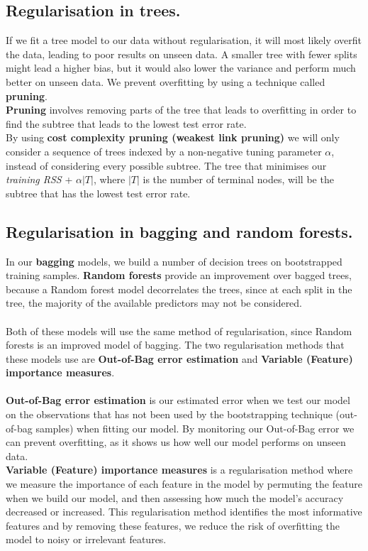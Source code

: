 \documentclass[12pt]{article}
\begin{document}
\subsection*{Regularisation in trees.}
If we fit a tree model to our data without regularisation, it will most likely overfit the data, leading to poor results on unseen data. 
A smaller tree with fewer splits might lead a higher bias, but it would also lower the variance and perform much better on unseen data.
We prevent overfitting by using a technique called \textbf{pruning}.\\
\textbf{Pruning} involves removing parts of the tree that leads to overfitting in order to find the subtree that leads to the lowest test error rate.
\\ By using \textbf{cost complexity pruning (weakest link pruning)} we will only consider a sequence of trees indexed by a non-negative tuning parameter $\alpha$,
instead of considering every possible subtree. The tree that minimises our \textit{training RSS} + $\alpha|T|$, where $|T|$ is the number of terminal nodes,
will be the subtree that has the lowest test error rate.

\subsection*{Regularisation in bagging and random forests.}
In our \textbf{bagging} models, we build a number of decision trees on bootstrapped training samples. \textbf{Random forests}
provide an improvement over bagged trees, because a Random forest model decorrelates the trees, since at each split in the tree,
the majority of the available predictors may not be considered. \\ \\
Both of these models will use the same method of regularisation, since Random forests is an improved model of bagging.
The two regularisation methods that these models use are \textbf{Out-of-Bag error estimation} and \textbf{Variable (Feature) importance measures}.
\\ \\
\textbf{Out-of-Bag error estimation} is our estimated error when we test our model on the observations that has not been used by the bootstrapping technique (out-of-bag samples) when fitting our model.
By monitoring our Out-of-Bag error we can prevent overfitting, as it shows us how well our model performs on unseen data.\\
\textbf{Variable (Feature) importance measures} is a regularisation method where we measure the importance of each feature in the model by permuting the feature when we build our model,
and then assessing how much the model's accuracy decreased or increased. This regularisation method identifies the most informative features and by removing these features,
we reduce the risk of overfitting the model to noisy or irrelevant features.
\end{document}
